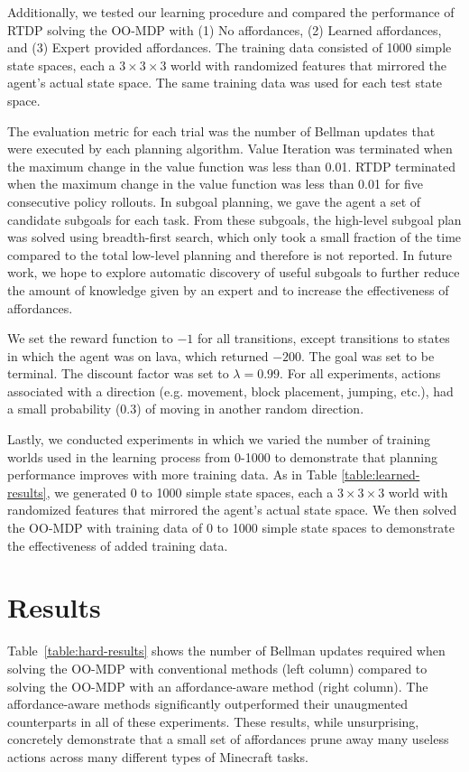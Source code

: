 \documentclass[letterpaper]{article}
\begin{document}
Additionally, we tested our learning procedure and compared the performance of RTDP solving the OO-MDP
with (1) No affordances, (2) Learned affordances, and (3) Expert provided affordances. The training data consisted of 1000 simple state
spaces, each a $3\times3\times3$ world with randomized features that mirrored the agent's actual state space. The same training data was used
for each test state space.

The evaluation metric for each trial was the
number of Bellman updates that were executed by each planning
algorithm. Value Iteration was terminated when the maximum change in
the value function was less than 0.01. RTDP terminated when the
maximum change in the value function was less than 0.01 for five
consecutive policy rollouts. In subgoal planning, we gave the agent
a set of candidate subgoals for each task. From these subgoals, the high-level
subgoal plan was solved using breadth-first search, which only took a
small fraction of the time compared to the total low-level planning
and therefore is not reported. In future work, we hope to explore
automatic discovery of useful subgoals to further reduce the amount of
knowledge given by an expert and to increase the effectiveness of affordances.

We set the reward function to $-1$ for all transitions, except
transitions to states in which the agent was on lava, which returned 
$-200$. The goal was set to be terminal. The discount
factor was set to $\lambda = 0.99$. For all experiments, actions associated with
a direction (e.g. movement, block placement, jumping, etc.), had a small 
probability ($0.3$) of moving in another random direction.

Lastly, we conducted experiments in which we varied the number of training worlds
used in the learning process from 0-1000 to demonstrate that planning
performance improves with more training data. As in Table \ref{table:learned-results}, we generated 0 to 1000 simple state
spaces, each a $3\times3\times3$ world with randomized features that mirrored the agent's actual state space. We then solved
the OO-MDP with training data of 0 to 1000 simple state spaces to demonstrate the effectiveness of added training data.

\section{Results}
\label{sec:results}

Table~\ref{table:hard-results} shows the number of Bellman updates required when solving the OO-MDP with conventional methods (left column)
compared to solving the OO-MDP with an affordance-aware method (right column).  The
affordance-aware methods significantly outperformed their unaugmented
counterparts in all of these experiments. These
results, while unsurprising, concretely demonstrate that a small set of affordances prune away many useless actions across many different types of Minecraft tasks. 
\end{document}
